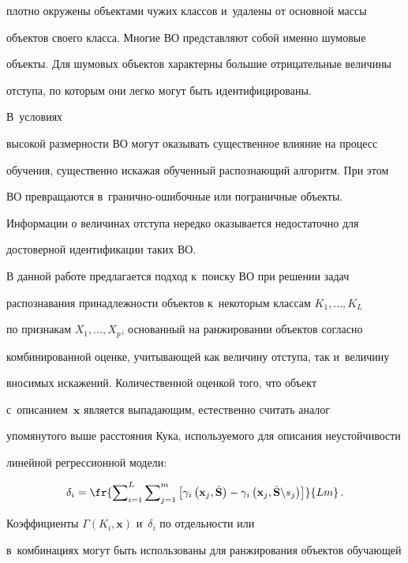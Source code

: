 плотно окружены объектами чужих классов и~удалены от основной массы 

объектов своего класса. Многие ВО представляют собой именно шумовые 

объекты. Для шумовых объектов характерны большие отрицательные величины 

отступа, по которым они легко могут быть идентифицированы. 



В~условиях 

высокой размерности ВО могут оказывать существенное влияние на процесс 

обучения, существенно искажая обученный распознающий алгоритм. При этом 

ВО превращаются в~гра\-нич\-но-оши\-боч\-ные или пограничные объекты. 

Информации о величинах отступа нередко оказывается недостаточно для 

достоверной идентификации таких ВО. 

  

  В данной работе предлагается подход к~поиску ВО при решении задач 

распознавания принадлежности объектов к~некоторым классам $K_1, \ldots , K_L$ 

по признакам $X_1,\ldots , X_p$, основанный на ранжировании объектов согласно 

комбинированной оценке, учитывающей как величину отступа, так и~величину 

вносимых искажений. Количественной оценкой того, что объект 

с~описанием~$\mathbf{x}$  является выпадающим, естественно считать аналог 

упомянутого выше расстояния Кука, используемого для описания неустойчивости 

линейной регрессионной модели:

  $$

  \delta_i=\fr{\sum\nolimits^L_{i=1} \sum\nolimits^m_{j=1} \left[ \gamma_i \left( 

\mathbf{x}_j, \tilde{\mathbf{S}}\right) -\gamma_i \left( \mathbf{x}_j, 

\tilde{\mathbf{S}}\backslash s_j\right)\right]} {Lm}\,.

  $$

Коэффициенты $\Gamma(K_i,\mathbf{x})$ и~$\delta_i$ по отдельности или 

в~комбинациях могут быть использованы для ранжирования объектов обучающей 

